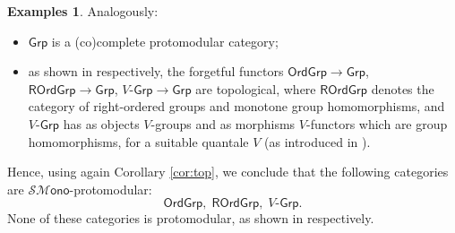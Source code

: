 \documentclass[11pt]{amsart}
\theoremstyle{plain}
\theoremstyle{definition}
\newtheorem{examples}[subsection]{Examples}
\theoremstyle{remark}
\newcommand{\Grp}{\ensuremath{\mathsf{Grp}}}
\newcommand{\OrdGrp}{\ensuremath{\mathsf{OrdGrp}}}
\newcommand{\ROrdGrp}{\ensuremath{\mathsf{ROrdGrp}}}
\newcommand{\SMono}{\ensuremath{\mathscr{SM}\mathsf{ono}}}
\begin{document}
\begin{examples}\label{exe:Grp}
Analogously:
\begin{itemize}
\item $\Grp$ is a (co)complete protomodular category;
\item as shown in \cite{CM-FM, CM1, CM2} respectively, the forgetful functors $\OrdGrp\to\Grp$, $\ROrdGrp\to\Grp$, $V$-$\Grp\to\Grp$ are topological, where $\ROrdGrp$ denotes the category of right-ordered groups and monotone group homomorphisms, and $V\mbox{-}\Grp$ has as objects $V$-groups and as morphisms $V$-functors which are group homomorphisms, for a suitable quantale $V$ (as introduced in \cite{CM1}).
\end{itemize}
Hence, using again Corollary \ref{cor:top}, we conclude that the following categories are $\SMono$-pro\-to\-mo\-du\-lar:
\[\OrdGrp,\;\ROrdGrp,\;V\mbox{-}\Grp.\]
None of these categories is protomodular, as shown in \cite{CM-FM, CM1, CM2} respectively.
\end{examples}
\end{document}
